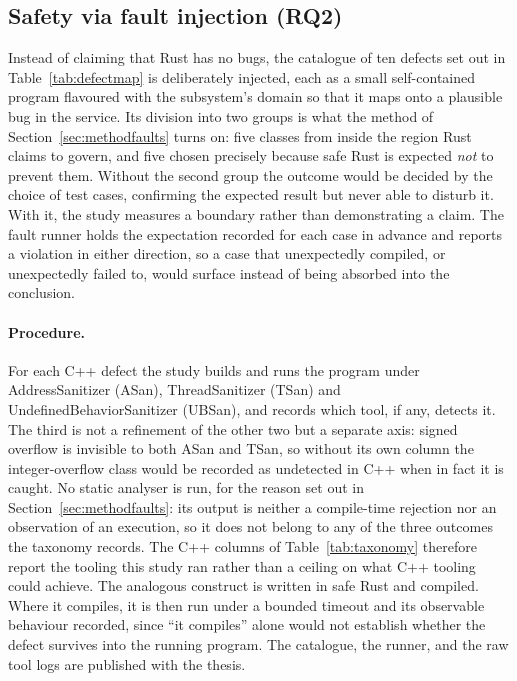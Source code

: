 \documentclass[english,twoside,openright,a4paper,censored,csm,software-track-2020]{HYthesisML}
\begin{document}
\subsection{Safety via fault injection (RQ2)}\label{sec:safetyresults}
Instead of claiming that Rust has no bugs, the catalogue of ten defects set out in
Table~\ref{tab:defectmap} is deliberately injected, each as a small self-contained program
flavoured with the subsystem's domain so that it maps onto a plausible bug in the service. Its
division into two groups is what the method of Section~\ref{sec:methodfaults} turns on: five
classes from inside the region Rust claims to govern, and five chosen precisely because safe
Rust is expected \emph{not} to prevent them. Without the second group the outcome would be
decided by the choice of test cases, confirming the expected result but never able to disturb
it. With it, the study measures a boundary rather than demonstrating a claim. The fault runner
holds the expectation recorded for each case in advance and reports a violation in either
direction, so a case that unexpectedly compiled, or unexpectedly failed to, would surface
instead of being absorbed into the conclusion.

\paragraph{Procedure.}
For each C++ defect the study builds and runs the program under AddressSanitizer (ASan),
ThreadSanitizer (TSan) and UndefinedBehaviorSanitizer (UBSan), and records which tool, if any,
detects it. The third is not a refinement of the other two but a separate axis: signed overflow
is invisible to both ASan and TSan, so without its own column the integer-overflow class would
be recorded as undetected in C++ when in fact it is caught. No static analyser is
run, for the reason set out in Section~\ref{sec:methodfaults}: its output is neither a
compile-time rejection nor an observation of an execution, so it does not belong to any of the
three outcomes the taxonomy records. The C++ columns of Table~\ref{tab:taxonomy} therefore
report the tooling this study ran rather than a ceiling on what C++ tooling could achieve. The
analogous construct is written in safe Rust and compiled. Where it compiles, it is then run
under a bounded timeout and its observable behaviour recorded, since ``it compiles'' alone would
not establish whether the defect survives into the running program. The catalogue, the runner,
and the raw tool logs are published with the thesis.
\end{document}
